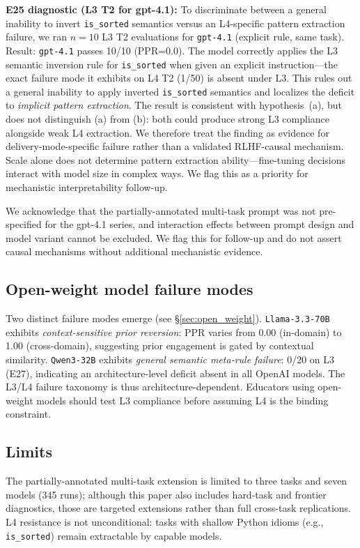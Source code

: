 \textbf{E25 diagnostic (L3 T2 for gpt-4.1):} To discriminate between a general inability to invert \texttt{is\_sorted} semantics versus an L4-specific pattern extraction failure, we ran $n=10$ L3 T2 evaluations for \texttt{gpt-4.1} (explicit rule, same task). Result: \texttt{gpt-4.1} passes 10/10 (PPR=0.0). The model correctly applies the L3 semantic inversion rule for \texttt{is\_sorted} when given an explicit instruction---the exact failure mode it exhibits on L4 T2 (1/50) is absent under L3. This rules out a general inability to apply inverted \texttt{is\_sorted} semantics and localizes the deficit to \emph{implicit pattern extraction}. The result is consistent with hypothesis~(a), but does not distinguish (a) from (b): both could produce strong L3 compliance alongside weak L4 extraction. We therefore treat the finding as evidence for delivery-mode-specific failure rather than a validated RLHF-causal mechanism. Scale alone does not determine pattern extraction ability---fine-tuning decisions interact with model size in complex ways. We flag this as a priority for mechanistic interpretability follow-up.

We acknowledge that the partially-annotated multi-task prompt was not pre-specified for the gpt-4.1 series, and interaction effects between prompt design and model variant cannot be excluded. We flag this for follow-up and do not assert causal mechanisms without additional mechanistic evidence.

\subsection{Open-weight model failure modes}
\label{sec:open_weight_discussion}
Two distinct failure modes emerge (see \S\ref{sec:open_weight}). \texttt{Llama-3.3-70B} exhibits \emph{context-sensitive prior reversion}: PPR varies from 0.00 (in-domain) to 1.00 (cross-domain), suggesting prior engagement is gated by contextual similarity. \texttt{Qwen3-32B} exhibits \emph{general semantic meta-rule failure}: 0/20 on L3 (E27), indicating an architecture-level deficit absent in all OpenAI models. The L3/L4 failure taxonomy is thus architecture-dependent. Educators using open-weight models should test L3 compliance before assuming L4 is the binding constraint.

\subsection{Limits}
The partially-annotated multi-task extension is limited to three tasks and seven models (345 runs); although this paper also includes hard-task and frontier diagnostics, those are targeted extensions rather than full cross-task replications. L4 resistance is not unconditional: tasks with shallow Python idioms (e.g., \texttt{is\_sorted}) remain extractable by capable models.

